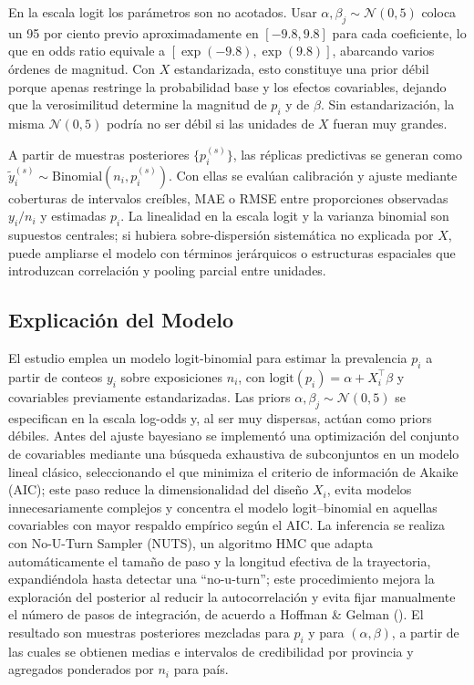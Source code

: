 \documentclass[
]{article}
\begin{document}
En la escala logit los parámetros son no acotados. Usar
\(\alpha,\beta_j\sim\mathcal N(0,5)\) coloca un 95 por ciento previo
aproximadamente en \([-9.8,9.8]\) para cada coeficiente, lo que en odds
ratio equivale a \([\exp(-9.8),\exp(9.8)]\), abarcando varios órdenes de
magnitud. Con \(X\) estandarizada, esto constituye una prior débil
porque apenas restringe la probabilidad base y los efectos covariables,
dejando que la verosimilitud determine la magnitud de \(p_i\) y de
\(\beta\). Sin estandarización, la misma \(\mathcal N(0,5)\) podría no
ser débil si las unidades de \(X\) fueran muy grandes.

A partir de muestras posteriores \(\{p_i^{(s)}\}\), las réplicas
predictivas se generan como
\(\tilde y_i^{(s)}\sim\mathrm{Binomial}(n_i,p_i^{(s)})\). Con ellas se
evalúan calibración y ajuste mediante coberturas de intervalos creíbles,
MAE o RMSE entre proporciones observadas \(y_i/n_i\) y estimadas
\(p_i\). La linealidad en la escala logit y la varianza binomial son
supuestos centrales; si hubiera sobre-dispersión sistemática no
explicada por \(X\), puede ampliarse el modelo con términos jerárquicos
o estructuras espaciales que introduzcan correlación y pooling parcial
entre unidades.

\subsection{Explicación del Modelo}\label{explicaciuxf3n-del-modelo}

El estudio emplea un modelo logit-binomial para estimar la prevalencia
\(p_i\) a partir de conteos \(y_i\) sobre exposiciones \(n_i\), con
\(\mathrm{logit}(p_i)=\alpha+X_i^{\top}\beta\) y covariables previamente
estandarizadas. Las priors \(\alpha,\beta_j\sim\mathcal N(0,5)\) se
especifican en la escala log-odds y, al ser muy dispersas, actúan como
priors débiles. Antes del ajuste bayesiano se implementó una
optimización del conjunto de covariables mediante una búsqueda
exhaustiva de subconjuntos en un modelo lineal clásico, seleccionando el
que minimiza el criterio de información de Akaike (AIC); este paso
reduce la dimensionalidad del diseño \(X_i\), evita modelos
innecesariamente complejos y concentra el modelo logit--binomial en
aquellas covariables con mayor respaldo empírico según el AIC. La
inferencia se realiza con No-U-Turn Sampler (NUTS), un algoritmo HMC que
adapta automáticamente el tamaño de paso y la longitud efectiva de la
trayectoria, expandiéndola hasta detectar una ``no-u-turn''; este
procedimiento mejora la exploración del posterior al reducir la
autocorrelación y evita fijar manualmente el número de pasos de
integración, de acuerdo a Hoffman \& Gelman
(). El resultado son muestras
posteriores mezcladas para \(p_i\) y para \((\alpha,\beta)\), a partir
de las cuales se obtienen medias e intervalos de credibilidad por
provincia y agregados ponderados por \(n_i\) para país.
\end{document}
